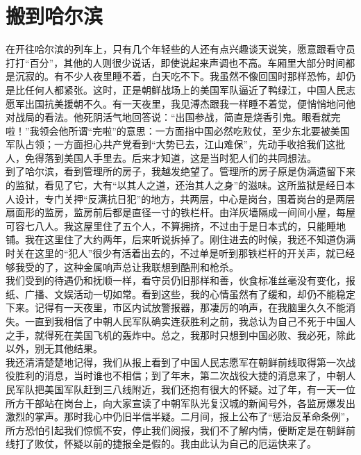 \fancyhead[RO]{} %
\fancyhead[LE]{} %
\chapter*{搬到哈尔滨}
\thispagestyle{empty}
在开往哈尔滨的列车上，只有几个年轻些的人还有点兴趣谈天说笑，愿意跟看守员打打“百分”，其他的人则很少说话，即使说起来声调也不高。车厢里大部分时间都是沉寂的。有不少人夜里睡不着，白天吃不下。我虽然不像回国时那样恐怖，却仍是比任何人都紧张。这时，正是朝鲜战场上的美国军队逼近了鸭绿江，中国人民志愿军出国抗美援朝不久。有一天夜里，我见溥杰跟我一样睡不着觉，便悄悄地问他对战局的看法。他死阴活气地回答说：“出国参战，简直是烧香引鬼。眼看就完啦！”我领会他所谓“完啦”的意思：一方面指中国必然吃败仗，至少东北要被美国军队占领；一方面担心共产党看到“大势已去，江山难保”，先动手收拾我们这批人，免得落到美国人手里去。后来才知道，这是当时犯人们的共同想法。\\

到了哈尔滨，看到管理所的房子，我越发绝望了。管理所的房子原是伪满遗留下来的监狱，看见了它，大有“以其人之道，还治其人之身”的滋味。这所监狱是经日本人设计，专门关押“反满抗日犯”的地方，共两层，中心是岗台，围着岗台的是两层扇面形的监房，监房前后都是直径一寸的铁栏杆。由洋灰墙隔成一间间小屋，每屋可容七八人。我这屋里住了五个人，不算拥挤，不过由于是日本式的，只能睡地铺。我在这里住了大约两年，后来听说拆掉了。刚住进去的时候，我还不知道伪满时关在这里的“犯人”很少有活着出去的，不过单是听到那铁栏杆的开关声，就已经够我受的了，这种金属响声总让我联想到酷刑和枪杀。\\

我们受到的待遇仍和抚顺一样，看守员仍旧那样和善，伙食标准丝毫没有变化，报纸、广播、文娱活动一切如常。看到这些，我的心情虽然有了缓和，却仍不能稳定下来。记得有一天夜里，市区内试放警报器，那凄厉的响声，在我脑里久久不能消失。一直到我相信了中朝人民军队确实连获胜利之前，我总认为自己不死于中国人之手，就得死在美国飞机的轰炸中。总之，我那时只想到中国必败、我必死，除此以外，别无其他结果。\\

我还清清楚楚地记得，我们从报上看到了中国人民志愿军在朝鲜前线取得第一次战役胜利的消息，当时谁也不相信；到了年末，第二次战役大捷的消息来了，中朝人民军队把美国军队赶到三八线附近，我们还抱有很大的怀疑。过了年，有一天一位所方干部站在岗台上，向大家宣读了中朝军队光复汉城的新闻号外，各监房爆发出激烈的掌声。那时我心中仍旧半信半疑。二月间，报上公布了“惩治反革命条例”，所方恐怕引起我们惊慌不安，停止我们阅报，我们不了解内情，便断定是在朝鲜前线打了败仗，怀疑以前的捷报全是假的。我由此认为自己的厄运快来了。\\

